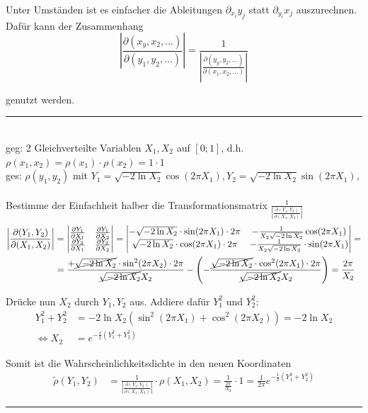 \documentclass{article}
\newcommand{\lr}[1]{\left(#1\right)}
\begin{document}
Unter Umständen ist es einfacher die Ableitungen $\partial_{x_i} y_j$ statt $\partial_{y_i} x_j$ auszurechnen. Dafür kann der Zusammenhang
	\begin{equation}
		\left| \frac{\partial(x_y, x_2, ...)}{\partial (y_1, y_2, ...)} \right| = \frac{1}{\left| \frac{\partial(y_y, y_2, ...)}{\partial (x_1, x_2, ...)} \right|}
	\end{equation}

genutzt werden.

\vspace{0.5cm}

{\color{blue}
\hrule
	\\
	geg: 2 Gleichverteilte Variablen $X_1, X_2$ auf $[0;1]$, d.h. $\rho(x_1,x_2) = \rho(x_1)\cdot \rho(x_2) = 1\cdot 1$\\
	ges: $\rho(y_1,y_2)$ mit $Y_1 = \sqrt{-2\ln X_2} \cos(2\pi X_1), Y_2 = \sqrt{-2\ln X_2} \sin(2\pi X_1),$\\
	\\
	Bestimme der Einfachheit halber die Transformationsmatrix $\frac{1}{\left| \frac{\partial(Y_1,Y_2)}{\partial(X_1,X_2)} \right|}$
		\begin{align*}
			\left| \frac{\partial(Y_1, Y_2)}{\partial(X_1, X_2)}\right| &= 
			\begin{vmatrix}
				\frac{\partial Y_1}{\partial X_1} & \frac{\partial Y_1}{\partial X_2} \\
				\frac{\partial Y_2}{\partial X_1} & \frac{\partial Y_2}{\partial X_2}
			\end{vmatrix}
			=
			\begin{vmatrix}
				-\sqrt{-2\ln X_2} \cdot \sin(2\pi X_1) \cdot 2\pi & -\frac{1}{X_2 \sqrt{-2\ln X_2}} \cos(2\pi X_1) \\
				\sqrt{-2\ln X_2} \cdot \cos(2\pi X_1) \cdot 2\pi & - \frac{1}{X_2 \sqrt{-2\ln X_2}} \cdot \sin(2\pi X_1)
			\end{vmatrix} = \\
			&= \frac{+ \cancel{\sqrt{-2\ln X_2}} \cdot \sin^2(2\pi X_2)\cdot 2\pi}{\cancel{\sqrt{-2\ln X_2}} X_2} - \lr{ -\frac{\cancel{\sqrt{-2\ln X_2}} \cdot \cos^2(2\pi X_1) \cdot 2\pi}{\cancel{\sqrt{-2\ln X_2}} X_2}} = \frac{2\pi}{X_2}
		\end{align*}
	
	Drücke nun $X_2$ durch $Y_1, Y_2$ aus. Addiere dafür $Y_1^2$ und $Y_2^2$:
		\begin{align*}
			Y_1^2 + Y_2^2 &= -2\ln X_2 (\sin^2(2\pi X_1) + \cos^2(2\pi X_2)) = -2\ln X_2 \\
			\Leftrightarrow X_2 &= e^{-\frac{1}{2}(Y_1^2 + Y_2^2)}
		\end{align*}
	
	Somit ist die Wahrscheinlichkeitsdichte in den neuen Koordinaten
		\begin{align*}
			\tilde{\rho}(Y_1,Y_2) &= \frac{1}{\left|\frac{\partial(Y_1,Y_2)}{\partial(X_1,X_2)}\right|} \cdot \rho(X_1,X_2) = \frac{1}{\frac{2\pi}{X_2}} \cdot 1 = \frac{1}{2\pi} e^{-\frac{1}{2}(Y_1^2 + Y_2^2)}
		\end{align*}
\hrule
}
\end{document}
